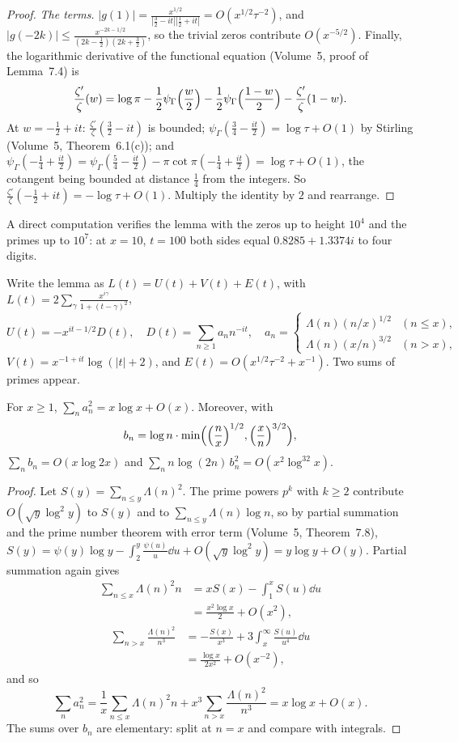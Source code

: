 \begin{proof}
\emph{The terms.} $|g(1)|=\frac{x^{1/2}}{|\frac32-it||\frac12+it|}=O(x^{1/2}\tau^{-2})$, and $|g(-2k)|\le\frac{x^{-2k-1/2}}{(2k-\frac12)(2k+\frac32)}$, so the trivial zeros contribute $O(x^{-5/2})$. Finally, the logarithmic derivative of the functional equation (Volume~5, proof of Lemma~7.4) is
\[
\frac{\zeta'}\zeta(w)=\log\pi-\frac12\psi_\Gamma\Bigl(\frac w2\Bigr)-\frac12\psi_\Gamma\Bigl(\frac{1-w}2\Bigr)-\frac{\zeta'}\zeta(1-w).
\]
At $w=-\frac12+it$: $\frac{\zeta'}\zeta(\frac32-it)$ is bounded; $\psi_\Gamma(\frac34-\frac{it}2)=\log\tau+O(1)$ by Stirling (Volume~5, Theorem~6.1(c)); and $\psi_\Gamma(-\frac14+\frac{it}2)=\psi_\Gamma(\frac54-\frac{it}2)-\pi\cot\pi(-\frac14+\frac{it}2)=\log\tau+O(1)$, the cotangent being bounded at distance $\frac14$ from the integers. So $\frac{\zeta'}\zeta(-\frac12+it)=-\log\tau+O(1)$. Multiply the identity by $2$ and rearrange.
\end{proof}

A direct computation verifies the lemma with the zeros up to height $10^4$ and the primes up to $10^7$: at $x=10$, $t=100$ both sides equal $0.8285+1.3374i$ to four digits.

Write the lemma as $L(t)=U(t)+V(t)+E(t)$, with $L(t)=2\sum_\gamma\frac{x^{i\gamma}}{1+(t-\gamma)^2}$,
\[
U(t)=-x^{it-1/2}D(t),\quad D(t)=\sum_{n\ge1}a_nn^{-it},\quad a_n=\begin{cases}\Lambda(n)(n/x)^{1/2}&(n\le x),\\\Lambda(n)(x/n)^{3/2}&(n>x),\end{cases}
\]
$V(t)=x^{-1+it}\log(|t|+2)$, and $E(t)=O(x^{1/2}\tau^{-2}+x^{-1})$. Two sums of primes appear.

\begin{lemma}\label{lem:lambdasq}
For $x\ge1$, $\sum_na_n^2=x\log x+O(x)$. Moreover, with
\[
b_n=\log n\cdot\min\Bigl(\Bigl(\frac nx\Bigr)^{1/2},\Bigl(\frac xn\Bigr)^{3/2}\Bigr),
\]
$\sum_nb_n=O(x\log2x)$ and $\sum_nn\log(2n)\,b_n^2=O(x^2\log^32x)$.
\end{lemma}
\begin{proof}
Let $S(y)=\sum_{n\le y}\Lambda(n)^2$. The prime powers $p^k$ with $k\ge2$ contribute $O(\sqrt y\log^2y)$ to $S(y)$ and to $\sum_{n\le y}\Lambda(n)\log n$, so by partial summation and the prime number theorem with error term (Volume~5, Theorem~7.8), $S(y)=\psi(y)\log y-\int_2^y\frac{\psi(u)}u\dd u+O(\sqrt y\log^2y)=y\log y+O(y)$. Partial summation again gives
\[
\begin{aligned}\sum_{n\le x}\Lambda(n)^2n&=xS(x)-\int_1^xS(u)\dd u\\&=\frac{x^2\log x}2+O(x^2),\end{aligned}
\]
\[
\begin{aligned}\sum_{n>x}\frac{\Lambda(n)^2}{n^3}&=-\frac{S(x)}{x^3}+3\int_x^\infty\frac{S(u)}{u^4}\dd u\\&=\frac{\log x}{2x^2}+O(x^{-2}),\end{aligned}
\]
and so
\[
\sum_na_n^2=\frac1x\sum_{n\le x}\Lambda(n)^2n+x^3\sum_{n>x}\frac{\Lambda(n)^2}{n^3}=x\log x+O(x).
\] The sums over $b_n$ are elementary: split at $n=x$ and compare with integrals.
\end{proof}

